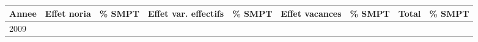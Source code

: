 \begin{longtable}[]{@{}lllllllll@{}}
\toprule
\begin{minipage}[b]{0.05\columnwidth}\raggedright
Annee\strut
\end{minipage} & \begin{minipage}[b]{0.10\columnwidth}\raggedright
Effet noria\strut
\end{minipage} & \begin{minipage}[b]{0.06\columnwidth}\raggedright
\% SMPT\strut
\end{minipage} & \begin{minipage}[b]{0.17\columnwidth}\raggedright
Effet var. effectifs\strut
\end{minipage} & \begin{minipage}[b]{0.06\columnwidth}\raggedright
\% SMPT\strut
\end{minipage} & \begin{minipage}[b]{0.13\columnwidth}\raggedright
Effet vacances\strut
\end{minipage} & \begin{minipage}[b]{0.06\columnwidth}\raggedright
\% SMPT\strut
\end{minipage} & \begin{minipage}[b]{0.05\columnwidth}\raggedright
Total\strut
\end{minipage} & \begin{minipage}[b]{0.06\columnwidth}\raggedright
\% SMPT\strut
\end{minipage}\tabularnewline
\midrule
\endhead
\begin{minipage}[t]{0.05\columnwidth}\raggedright
2009\strut
\end{minipage} & \begin{minipage}[t]{0.10\columnwidth}\raggedright
\strut
\end{minipage} & \begin{minipage}[t]{0.06\columnwidth}\raggedright
\strut
\end{minipage} & \begin{minipage}[t]{0.17\columnwidth}\raggedright
\strut
\end{minipage} & \begin{minipage}[t]{0.06\columnwidth}\raggedright
\strut
\end{minipage} & \begin{minipage}[t]{0.13\columnwidth}\raggedright
\strut
\end{minipage} & \begin{minipage}[t]{0.06\columnwidth}\raggedright

\end{minipage}
\end{longtable}
